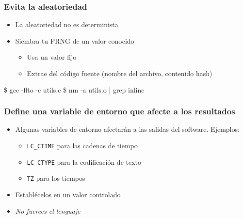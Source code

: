\documentclass[14pt,aspectratio=169]{beamer}
\begin{document}
{
\begin{frame}[fragile]
 \frametitle{Evita la aleatoriedad}

 \begin{itemize}
  \item La aleatoriedad no es determinista
  \item<2-> Siembra tu PRNG de un valor conocido
   \begin{itemize}
     \item Usa un valor fijo
     \item<3> Extrae del código fuente (nombre del archivo, contenido hash)
   \end{itemize}
 \end{itemize}

 \begin{example}
\begin{semiverbatim}\small
\$ gcc -flto -c utils.c
\$ nm -a utils.o | grep inline
\end{semiverbatim}
 \end{example}
\end{frame}
}

\begin{frame}
 \frametitle{Define una variable de entorno que afecte a los resultados}

 \begin{itemize}
  \item Algunas variables de entorno afectarán a las salidas del software. Ejemplos:
   \begin{itemize}
    \item \texttt{LC\_CTIME} para las cadenas de tiempo
    \item \texttt{LC\_CTYPE} para la codificación de texto
    \item \texttt{TZ} para los tiempos
   \end{itemize}
  \item<2-> Establécelos en un valor controlado
  \item<3> \textit{No fuerces el lenguaje}
 \end{itemize}
\end{frame}
\end{document}
